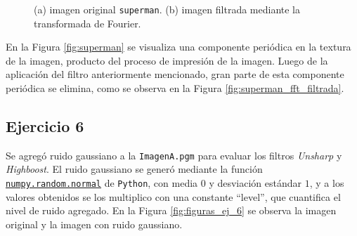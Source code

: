 \documentclass[11pt, twocolumn]{article}
\begin{document}
\begin{figure}[htbp]
  \centering
  \hfill
  \hfill
  \caption{(a) imagen original \texttt{superman}. (b) imagen filtrada mediante la transformada de Fourier.}
  \label{fig:figuras_fft_filtrada_ej_5} 
\end{figure}

En la Figura \ref{fig:superman} se visualiza una componente periódica en la textura de la imagen, producto del proceso de impresión de la imagen. Luego de la aplicación del filtro anteriormente mencionado, gran parte de esta componente periódica se elimina, como se observa en la Figura \ref{fig:superman_fft_filtrada}. 

\subsection*{Ejercicio 6}
Se agregó ruido gaussiano a la \texttt{ImagenA.pgm} para evaluar los filtros \textit{Unsharp} y \textit{Highboost}. El ruido gaussiano se generó mediante la función \href{https://numpy.org/doc/stable/reference/random/generated/numpy.random.normal.html}{\texttt{numpy.random.normal}} de \texttt{Python}, con media $0$ y desviación estándar $1$, y a los valores obtenidos se los multiplico con una constante ``level'', que cuantifica el nivel de ruido agregado. En la Figura \ref{fig:figuras_ej_6} se observa la imagen original y la imagen con ruido gaussiano.
\end{document}

